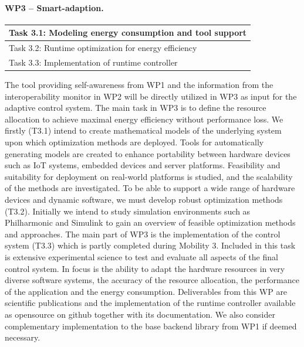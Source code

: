 \documentclass{article}
\begin{document}
\paragraph{WP3 -- Smart-adaption.}
\begin{table}
\vspace{-0.5cm}
\small
\begin{tabular}{ | l |}
\hline
Task 3.1: Modeling energy consumption and tool support\\ \hline
Task 3.2: Runtime optimization for energy efficiency \\ \hline
Task 3.3: Implementation of runtime controller \\ \hline
\end{tabular}
\vspace{-0.3cm}
\end{table}
The tool providing self-awareness from WP1 and the information from the interoperability monitor in WP2 will be directly utilized in WP3 as input for the adaptive control system.
The main task in WP3 is to define the resource allocation to achieve maximal energy efficiency without performance loss.
We firstly (T3.1) intend to create mathematical models of the underlying system upon which optimization methods are deployed.
Tools for automatically generating models are created to enhance portability between hardware devices such as IoT systems, embedded devices and server platforms.
Feasibility and suitability for deployment on real-world platforms is studied, and the scalability of the methods are investigated.
To be able to support a wide range of hardware devices and dynamic software, we must develop robust optimization methods (T3.2).
Initially we intend to study simulation environments such as Philharmonic and Simulink to gain an overview of feasible optimization methods and approaches. 
The main part of WP3 is the implementation of the control system (T3.3) which is partly completed during Mobility 3.
Included in this task is extensive experimental science to test and evaluate all aspects of the final control system.
In focus is the ability to adapt the hardware resources in very diverse software systems, the accuracy of the resource allocation, the performance of the application and the energy consumption.
Deliverables from this WP are scientific publications and the implementation of the runtime controller available as opensource on github together with its documentation.
We also consider complementary implementation to the base backend library from WP1 if deemed necessary.
\end{document}
